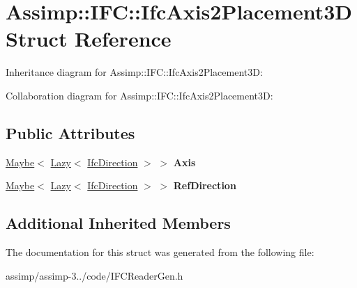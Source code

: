 \hypertarget{struct_assimp_1_1_i_f_c_1_1_ifc_axis2_placement3_d}{\section{Assimp\+:\+:I\+F\+C\+:\+:Ifc\+Axis2\+Placement3\+D Struct Reference}
\label{struct_assimp_1_1_i_f_c_1_1_ifc_axis2_placement3_d}
}


Inheritance diagram for Assimp\+:\+:I\+F\+C\+:\+:Ifc\+Axis2\+Placement3\+D\+:


Collaboration diagram for Assimp\+:\+:I\+F\+C\+:\+:Ifc\+Axis2\+Placement3\+D\+:
\subsection*{Public Attributes}
\begin{DoxyCompactItemize}
\item 
\hypertarget{struct_assimp_1_1_i_f_c_1_1_ifc_axis2_placement3_d_a0f402a5f7bf8d1118592545763447694}{\hyperlink{struct_assimp_1_1_s_t_e_p_1_1_maybe}{Maybe}$<$ \hyperlink{struct_assimp_1_1_s_t_e_p_1_1_lazy}{Lazy}$<$ \hyperlink{struct_assimp_1_1_i_f_c_1_1_ifc_direction}{Ifc\+Direction} $>$ $>$ {\bfseries Axis}}\label{struct_assimp_1_1_i_f_c_1_1_ifc_axis2_placement3_d_a0f402a5f7bf8d1118592545763447694}

\item 
\hypertarget{struct_assimp_1_1_i_f_c_1_1_ifc_axis2_placement3_d_a05b909270406032699c8e8ad2634b7c9}{\hyperlink{struct_assimp_1_1_s_t_e_p_1_1_maybe}{Maybe}$<$ \hyperlink{struct_assimp_1_1_s_t_e_p_1_1_lazy}{Lazy}$<$ \hyperlink{struct_assimp_1_1_i_f_c_1_1_ifc_direction}{Ifc\+Direction} $>$ $>$ {\bfseries Ref\+Direction}}\label{struct_assimp_1_1_i_f_c_1_1_ifc_axis2_placement3_d_a05b909270406032699c8e8ad2634b7c9}

\end{DoxyCompactItemize}
\subsection*{Additional Inherited Members}


The documentation for this struct was generated from the following file\+:\begin{DoxyCompactItemize}
\item 
assimp/assimp-\/3../code/I\+F\+C\+Reader\+Gen.\+h\end{DoxyCompactItemize}
